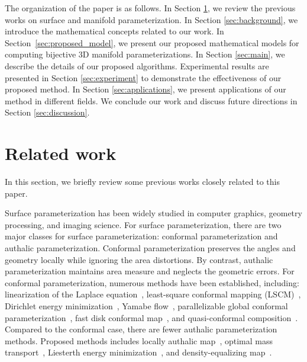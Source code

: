 \documentclass{article}
\begin{document}
The organization of the paper is as follows. In Section \ref{sec:related_work}, we review the previous works on surface and manifold parameterization. In Section \ref{sec:background}, we introduce the mathematical concepts related to our work. In Section~\ref{sec:proposed_model}, we present our proposed mathematical models for computing bijective 3D manifold parameterizations. In Section \ref{sec:main}, we describe the details of our proposed algorithms. Experimental results are presented in Section \ref{sec:experiment} to demonstrate the effectiveness of our proposed method. In Section \ref{sec:applications}, we present applications of our method in different fields. We conclude our work and discuss future directions in Section \ref{sec:discussion}.

\section{Related work}\label{sec:related_work}
In this section, we briefly review some previous works closely related to this paper.

Surface parameterization has been widely studied in computer graphics, geometry processing, and imaging science. For surface parameterization, there are two major classes for surface parameterization: conformal parameterization and authalic parameterization. Conformal parameterization preserves the angles and geometry locally while ignoring the area distortions. By contrast, authalic parameterization maintains area measure and neglects the geometric errors. For conformal parameterization, numerous methods have been established, including: linearization of the Laplace equation~\cite{angenent1999conformal}, least-square conformal mapping (LSCM)~\cite{levy2023least}, Dirichlet energy minimization~\cite{gu2004genus}, Yamabe flow~\cite{luo2004combinatorial,zeng2012computing}, parallelizable global conformal parameterization~\cite{choi2020parallelizable}, fast disk conformal map~\cite{choi2024fast}, and quasi-conformal composition~\cite{choi2015flash,choi2016spherical,choi2018linear}. 
Compared to the conformal case, there are fewer authalic parameterization methods. Proposed methods includes locally authalic map~\cite{nadeem2016spherical}, optimal mass transport~\cite{zhao2013area,su2016area}, Liesterth energy minimization~\cite{yueh2019novel},
and density-equalizing map~\cite{gastner2004diffusion,gastner2018fast,choi2018density,lyu2024bijective,lyu2024spherical,lyu2024ellipsoidal}.
\end{document}
